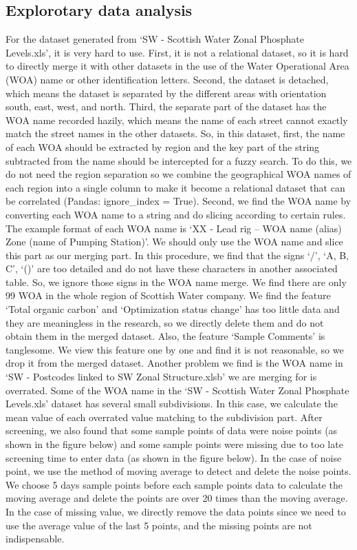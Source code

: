 \documentclass[11pt,twoside]{article}
\numberwithin{Theorem}{section}
\numberwithin{Definition}{section}
\numberwithin{Lemma}{section}
\numberwithin{Algorithm}{section}
\numberwithin{equation}{section}
\begin{document}
\clearpage

\subsection{Explorotary data analysis}
For the dataset generated from ‘SW - Scottish Water Zonal Phosphate Levels.xls’, it is very hard to use. First, it is not a relational dataset, so it is hard to directly merge it with other datasets in the use of the Water Operational Area (WOA) name or other identification letters. Second, the dataset is detached, which means the dataset is separated by the different areas with orientation south, east, west, and north. Third, the separate part of the dataset has the WOA name recorded hazily, which means the name of each street cannot exactly match the street names in the other datasets. So, in this dataset, first, the name of each WOA should be extracted by region and the key part of the string subtracted from the name should be intercepted for a fuzzy search. To do this, we do not need the region separation so we combine the geographical WOA names of each region into a single column to make it become a relational dataset that can be correlated (Pandas: ignore_index = True). Second, we find the WOA name by converting each WOA name to a string and do slicing according to certain rules. The example format of each WOA name is ‘XX - Lead rig – WOA name (alias) Zone (name of Pumping Station)’. We should only use the WOA name and slice this part as our merging part. In this procedure, we find that the signs ‘/’, ‘A, B, C’, ‘()’ are too detailed and do not have these characters in another associated table. So, we ignore those signs in the WOA name merge. We find there are only 99 WOA in the whole region of Scottish Water company. We find the feature ‘Total organic carbon’ and ‘Optimization status change’ has too little data and they are meaningless in the research, so we directly delete them and do not obtain them in the merged dataset. Also, the feature ‘Sample Comments’ is tanglesome. We view this feature one by one and find it is not reasonable, so we drop it from the merged dataset. Another problem we find is the WOA name in ‘SW - Postcodes linked to SW Zonal Structure.xlsb’ we are merging for is overrated. Some of the WOA name in the ‘SW - Scottish Water Zonal Phosphate Levels.xls’ dataset has several small subdivisions. In this case, we calculate the mean value of each overrated value matching to the subdivision part. After screening, we also found that some sample points of data were noise points (as shown in the figure below) and some sample points were missing due to too late screening time to enter data (as shown in the figure below). In the case of noise point, we use the method of moving average to detect and delete the noise points. We choose 5 days sample points before each sample points data to calculate the moving average and delete the points are over 20 times than the moving average. In the case of missing value, we directly remove the data points since we need to use the average value of the last 5 points, and the missing points are not indispensable.
\end{document}

